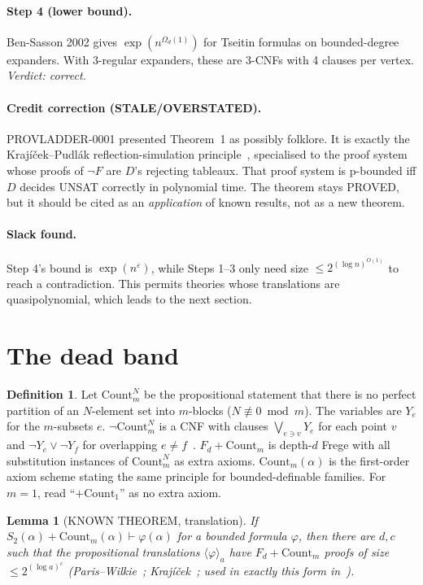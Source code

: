 \documentclass[11pt]{article}
\newtheorem{lemma}[theorem]{Lemma}
\theoremstyle{definition}
\newtheorem{definition}[theorem]{Definition}
\newcommand{\Count}{\mathrm{Count}}
\begin{document}
\paragraph{Step 4 (lower bound).} Ben-Sasson 2002 gives $\exp(n^{\Omega_d(1)})$ for Tseitin formulas on bounded-degree expanders.
With 3-regular expanders, these are 3-CNFs with 4 clauses per vertex. \emph{Verdict: correct.}
\paragraph{Credit correction (STALE/OVERSTATED).} PROVLADDER-0001 presented Theorem~1 as possibly folklore. It is exactly the
Krajíček--Pudlák reflection-simulation principle~\cite{KP89}, specialised to the proof system whose proofs of $\neg F$
are $D$'s rejecting tableaux. That proof system is p-bounded iff $D$ decides UNSAT correctly in polynomial time. The theorem
stays PROVED, but it should be cited as an \emph{application} of known results, not as a new theorem.
\paragraph{Slack found.} Step 4's bound is $\exp(n^{\varepsilon})$, while Steps 1--3 only need size $\le 2^{(\log n)^{O(1)}}$
to reach a contradiction. This permits theories whose translations are quasipolynomial, which leads to the next section.

\section{The dead band}
\begin{definition}
Let $\Count_m^N$ be the propositional statement that there is no perfect partition of an $N$-element set into $m$-blocks
($N\not\equiv0\bmod m$). The variables are $Y_e$ for the $m$-subsets $e$. $\neg\Count^N_m$ is a CNF with clauses
$\bigvee_{e\ni v}Y_e$ for each point $v$ and $\neg Y_e\vee\neg Y_f$ for overlapping $e\neq f$~\cite{BR98}.
$F_d+\Count_m$ is depth-$d$ Frege with all substitution instances of $\Count_m^N$ as extra axioms.
$\Count_m(\alpha)$ is the first-order axiom scheme stating the same principle for bounded-definable families.
For $m=1$, read ``$+\Count_1$'' as no extra axiom.
\end{definition}

\begin{lemma}[KNOWN THEOREM, translation]\label{lem:pw}
If $S_2(\alpha)+\Count_m(\alpha)\vdash\varphi(\alpha)$ for a bounded formula $\varphi$, then there are $d,c$ such that the propositional
translations $\langle\varphi\rangle_a$ have $F_d+\Count_m$ proofs of size $\le 2^{(\log a)^c}$
(Paris--Wilkie~\cite{PW85}; Krajíček~\cite[Ch.~9]{Kra95}; used in exactly this form in~\cite[Cor.~9.5]{BR98}).
\end{lemma}
\end{document}
